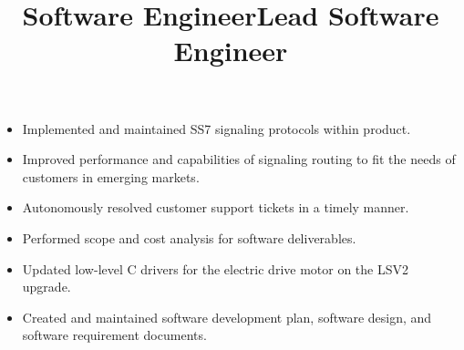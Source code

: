 \documentclass[margin]{res}
\begin{document}
\begin{resume}
\title{\textbf{Software Engineer}}
\begin{position}
\begin{itemize}[noitemsep, topsep=0pt]
\item Implemented and maintained SS7 signaling protocols within product. 
\item Improved performance and capabilities of signaling routing to fit the needs of customers in emerging markets. 
\item Autonomously resolved customer support tickets in a timely manner. 
\end{itemize}
\end{position}

\title{\textbf{Lead Software Engineer}}
\begin{position}
\begin{itemize}[noitemsep, topsep=0pt]
\item Performed scope and cost analysis for software deliverables. 
\item Updated low-level C drivers for the electric drive motor on the LSV2 upgrade.  
\item Created and maintained software development plan, software design, and software requirement documents. 
\end{itemize}
\end{position}

%


\end{resume}
\end{document}
